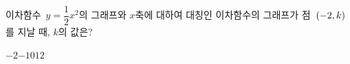 이차함수~$y=\dfrac{1}{2}x^2$의 그래프와 $x$축에 대하여 대칭인 이차함수의 그래프가 점~$(-2{,}\mkern3mu k)$를 지날 때, $k$의 값은?
\begin{choices32}{$-2$}{$-1$}{$0$}{$1$}{$2$}\end{choices32}
